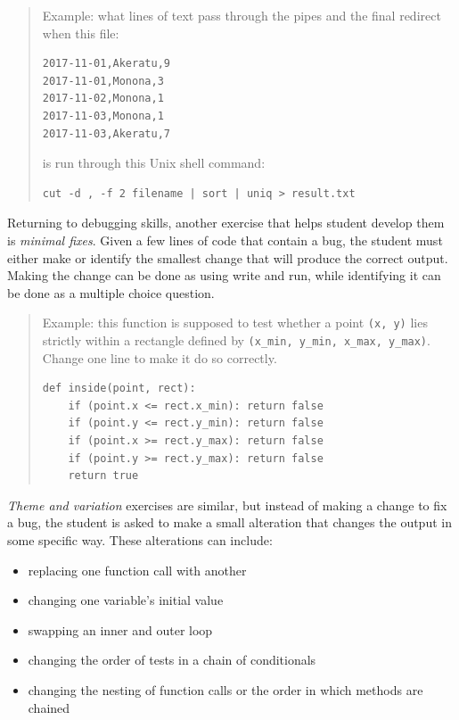 \documentclass[10pt,statementpaper]{memoir}
\providecommand{\tightlist}{%
  \setlength{\itemsep}{0pt}\setlength{\parskip}{0pt}}
\begin{document}
\begin{quote}
Example: what lines of text pass through the pipes and the final
redirect when this file:

\begin{verbatim}
2017-11-01,Akeratu,9
2017-11-01,Monona,3
2017-11-02,Monona,1
2017-11-03,Monona,1
2017-11-03,Akeratu,7
\end{verbatim}

is run through this Unix shell command:

\begin{verbatim}
cut -d , -f 2 filename | sort | uniq > result.txt
\end{verbatim}
\end{quote}

Returning to debugging skills, another exercise that helps student
develop them is \emph{minimal fixes}. Given a few lines of code that
contain a bug, the student must either make or identify the smallest
change that will produce the correct output. Making the change can be
done as using write and run, while identifying it can be done as a
multiple choice question.

\begin{quote}
Example: this function is supposed to test whether a point
\texttt{(x,\ y)} lies strictly within a rectangle defined by
\texttt{(x\_min,\ y\_min,\ x\_max,\ y\_max)}. Change one line to make it
do so correctly.

\begin{verbatim}
def inside(point, rect):
    if (point.x <= rect.x_min): return false
    if (point.y <= rect.y_min): return false
    if (point.x >= rect.y_max): return false
    if (point.y >= rect.y_max): return false
    return true
\end{verbatim}
\end{quote}

\emph{Theme and variation} exercises are similar, but instead of making
a change to fix a bug, the student is asked to make a small alteration
that changes the output in some specific way. These alterations can
include:

\begin{itemize}
\tightlist
\item
  replacing one function call with another
\item
  changing one variable's initial value
\item
  swapping an inner and outer loop
\item
  changing the order of tests in a chain of conditionals
\item
  changing the nesting of function calls or the order in which methods
  are chained
\end{itemize}
\end{document}
